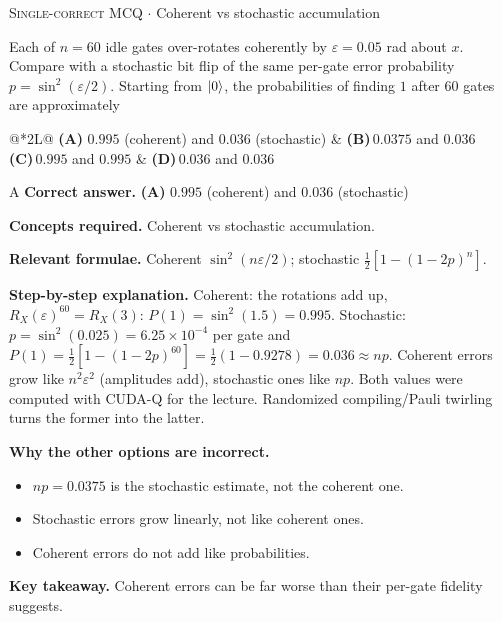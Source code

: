 \documentclass[11pt,a4paper]{article}
\newcommand{\optlabel}[1]{\textbf{(#1)}}
\newcommand{\correctlabel}[1]{\textcolor{okgreen}{\textbf{(#1)}\,\ding{51}}}
\newenvironment{qitem}[1]{\begin{list}{}{\setlength{\leftmargin}{3.3em}\setlength{\labelwidth}{3.1em}%
  \setlength{\labelsep}{0.2em}\setlength{\topsep}{3pt}\setlength{\parsep}{3pt}}\item[\textbf{Q.#1}\hfill]}{\end{list}}
\newcommand{\qsep}{\par\vspace{2pt}{\color{black!15}\hrule}\vspace{4pt}}
\newcommand{\qmeta}[2]{{\footnotesize\color{black!60}\textsc{#1} \;$\cdot$\; #2}\par}
\begin{document}
\begin{qitem}{72}
\qmeta{Single-correct MCQ}{Coherent vs stochastic accumulation}
Each of $n = 60$ idle gates over-rotates coherently by $\varepsilon = 0.05$ rad about $x$. Compare with a stochastic bit flip of the same per-gate error probability
$p = \sin^2(\varepsilon/2)$. Starting from $\ket0$, the probabilities of finding $1$ after 60 gates are approximately
\par\smallskip\noindent\begin{tabularx}{\linewidth}{@{}*{2}{L}@{}}
\correctlabel{A}\,$0.995$ (coherent) and $0.036$ (stochastic) & \optlabel{B}\,$0.0375$ and $0.036$ \\[3pt]
\optlabel{C}\,$0.995$ and $0.995$ & \optlabel{D}\,$0.036$ and $0.036$
\end{tabularx}
\end{qitem}
\begin{solbox}{A}
\textbf{\color{brand}Correct answer.} \textcolor{okgreen}{\textbf{(A)}} $0.995$ (coherent) and $0.036$ (stochastic)

\textbf{\color{brand}Concepts required.} Coherent vs stochastic accumulation.

\textbf{\color{brand}Relevant formulae.} Coherent $\sin^2(n\varepsilon/2)$; stochastic $\frac12[1 - (1-2p)^n]$.

\textbf{\color{brand}Step-by-step explanation.} Coherent: the rotations add up, $R_X(\varepsilon)^{60} = R_X(3)$: $P(1) = \sin^2(1.5) = 0.995$. Stochastic: $p = \sin^2(0.025) = 6.25\times10^{-4}$ per gate and
$P(1) = \frac12[1 - (1 - 2p)^{60}] = \frac12(1 - 0.9278) = 0.036 \approx np$. Coherent errors grow like $n^2\varepsilon^2$ (amplitudes add), stochastic ones like $np$.
Both values were computed with CUDA-Q for the lecture. Randomized compiling/Pauli twirling turns the former into the latter.

\textbf{\color{brand}Why the other options are incorrect.}
\begin{itemize}[leftmargin=2.4em, itemsep=1pt, topsep=2pt]
\item[\textbf{(B)}] $np = 0.0375$ is the stochastic estimate, not the coherent one.
\item[\textbf{(C)}] Stochastic errors grow linearly, not like coherent ones.
\item[\textbf{(D)}] Coherent errors do not add like probabilities.
\end{itemize}
\textbf{\color{brand}Key takeaway.} Coherent errors can be far worse than their per-gate fidelity suggests.
\end{solbox}
\qsep
\end{document}
